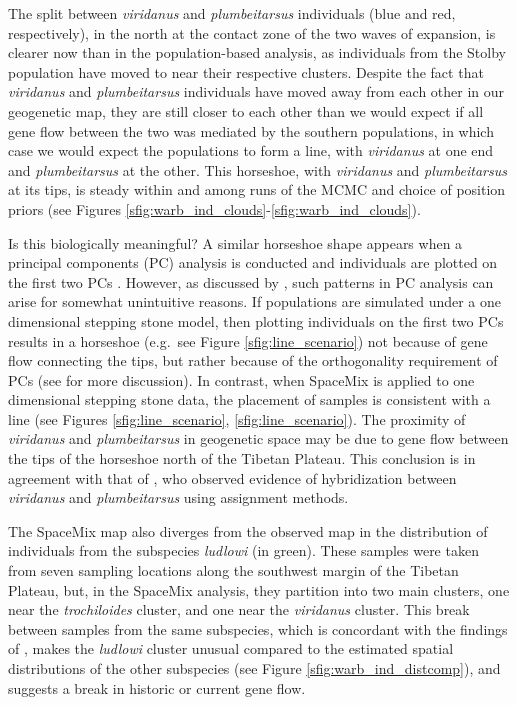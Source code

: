 \documentclass[12pt]{article}
\begin{document}
The split between \textit{viridanus} and \textit{plumbeitarsus} individuals (blue and red, respectively), in the north at the contact zone of the two waves of expansion, is clearer now than in the population-based analysis, as individuals from the Stolby population have moved to near their respective clusters. 
Despite the fact that \textit{viridanus} and \textit{plumbeitarsus} individuals have moved away from each other in our geogenetic map, 
they are still closer to each other than we would expect if all gene flow between the two was mediated by the southern populations,
in which case we would expect the populations to form a line, 
with \textit{viridanus} at one end and \textit{plumbeitarsus} at the other. 
This horseshoe, with \textit{viridanus} and \textit{plumbeitarsus} at its tips, is steady within and among runs of the MCMC and choice of position priors (see Figures \ref{sfig:warb_ind_clouds}-\ref{sfig:warb_ind_clouds}).  

Is this biologically meaningful?  A similar horseshoe shape appears when a principal components (PC) analysis is conducted and individuals are plotted on the first two PCs \citep[see Figure \ref{sfig:warb_ind_PC_map} and ][]{alcaide2014genomic}.  
However, as discussed by \citet{novembre_interpreting_2008}, such patterns in PC analysis can arise for somewhat unintuitive reasons. If populations are simulated under a one dimensional stepping stone model, then plotting individuals on the first two PCs results in a horseshoe (e.g.\ see Figure \ref{sfig:line_scenario}) not because of gene flow connecting the tips, but rather because of the orthogonality requirement of PCs (see \cite{novembre_interpreting_2008} for more discussion).  In contrast, when SpaceMix is applied to one dimensional stepping stone data, the placement of samples is consistent with a line (see Figures \ref{sfig:line_scenario}, \ref{sfig:line_scenario}). The proximity of \textit{viridanus} and \textit{plumbeitarsus} in geogenetic space may be due to gene flow between the tips of the horseshoe north of the Tibetan Plateau. This conclusion is in agreement with that of \citet{alcaide2014genomic}, who observed evidence of hybridization between \textit{viridanus} and \textit{plumbeitarsus} using assignment methods.

The SpaceMix map also diverges from the observed map in the distribution of individuals from the subspecies \textit{ludlowi} (in green).  These samples were taken from seven sampling locations along the southwest margin of the Tibetan Plateau, but, in the SpaceMix analysis, they partition into two main clusters, one near the \textit{trochiloides} cluster, and one near the \textit{viridanus} cluster.  This break between samples from the same subspecies, which is concordant with the findings of \citet{alcaide2014genomic}, makes the \textit{ludlowi} cluster unusual compared to the estimated spatial distributions of the other subspecies (see Figure \ref{sfig:warb_ind_distcomp}), and suggests a break in historic or current gene flow.
\end{document}
